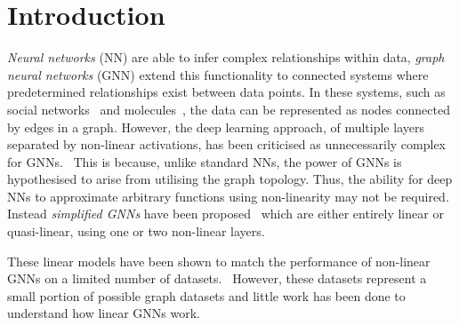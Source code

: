 \section{Introduction}





\emph{Neural networks} (NN) are able to infer complex relationships within data, \emph{graph neural networks} (GNN) extend this functionality to connected systems where predetermined relationships exist between data points.
In these systems, such as social networks~\cite{pmlr-v70-gilmer17a} and molecules~\cite{DBLP:journals/corr/abs-1806-01973}, the data can be represented as nodes connected by edges in a graph.
However, the deep learning approach, of multiple layers separated by non-linear activations, has been criticised as unnecessarily complex for GNNs.~\cite{wu2019simplifying}
This is because, unlike standard NNs, the power of GNNs is hypothesised to arise from utilising the graph topology.
Thus, the ability for deep NNs to approximate arbitrary functions using non-linearity may not be required.
Instead \emph{simplified GNNs} have been proposed~\cite{chanpuriya2022simplified,chien2020adaptive,wu2019simplifying} which are either entirely linear or quasi-linear, using one or two non-linear layers.

%
These linear models have been shown to match the performance of non-linear GNNs on a limited number of datasets.~\cite{wu2019simplifying, chanpuriya2022simplified, chien2020adaptive}
However, these datasets represent a small portion of possible graph datasets and little work has been done to understand how linear GNNs work.

